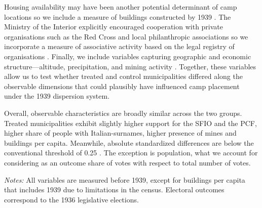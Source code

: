 Housing availability may have been another potential determinant of camp locations so we include a measure of buildings constructed by 1939 \citep{insee1968logements}. The Ministry of the Interior explicitly encouraged cooperation with private organisations such as the Red Cross and local philanthropic associations so we incorporate a measure of associative activity based on the legal registry of organisations \citep{dila_journalofficiel_portal}. Finally, we include variables capturing geographic and economic structure—altitude, precipitation, and mining activity \citep{pauling2006,camino2021}. Together, these variables allow us to test whether treated and control municipalities differed along the observable dimensions that could plausibly have influenced camp placement under the 1939 dispersion system.

Overall, observable characteristics are broadly similar across the two groups. Treated municipalities exhibit slightly higher support for the SFIO and the PCF, higher share of people with Italian-surnames, higher presence of mines and buildings per capita. Meanwhile, absolute standardized differences are below the conventional threshold of 0.25 \citep{ImbensRubin2015}. The exception is population, what we account for considering as an outcome share of votes with respect to total number of votes. 

\begin{table}[h!]
    \centering
    \caption{Balance test for municipalities with and without camps}
    \resizebox{0.8\textwidth}{!}{
    }
    \label{table:balance}
\begin{minipage}{0.8\textwidth}
        \vspace{0.5em}
\footnotesize
\textit{Notes:} All variables are measured before 1939, except for buildings per capita that includes 1939 due to limitations in the census. Electoral outcomes correspond to the 1936 legislative elections. 
\end{minipage}

\end{table}
